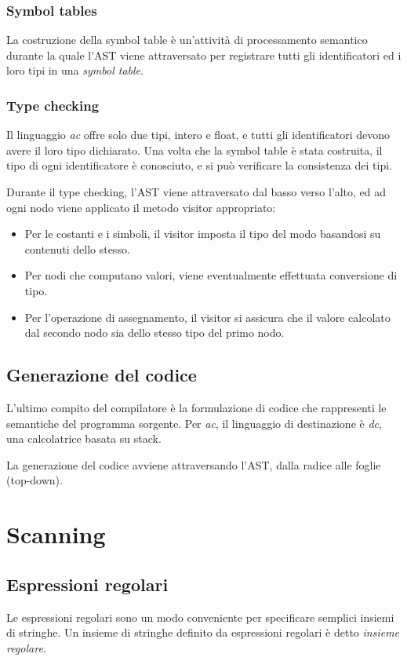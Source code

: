\documentclass[11pt]{article}
\begin{document}
\subsubsection{Symbol tables}
La costruzione della symbol table è un'attività di processamento semantico durante la quale l'AST viene attraversato per 
registrare tutti gli identificatori ed i loro tipi in una \textit{symbol table}.
\subsubsection{Type checking}
Il linguaggio \textit{ac} offre solo due tipi, intero e float, e tutti gli identificatori devono avere il loro tipo 
dichiarato. Una volta che la symbol table è stata costruita, il tipo di ogni identificatore è conosciuto, e si può verificare 
la consistenza dei tipi.

Durante il type checking, l'AST viene attraversato dal basso verso l'alto, ed ad ogni nodo viene applicato il metodo 
visitor appropriato:
\begin{itemize}
    \item Per le costanti e i simboli, il visitor imposta il tipo del modo basandosi su contenuti dello stesso.
    \item Per nodi che computano valori, viene eventualmente effettuata conversione di tipo.
    \item Per l'operazione di assegnamento, il visitor si assicura che il valore calcolato dal secondo nodo sia dello 
    stesso tipo del primo nodo.
\end{itemize}
\subsection{Generazione del codice}
L'ultimo compito del compilatore è la formulazione di codice che rappresenti le semantiche del programma sorgente. 
Per \textit{ac}, il linguaggio di destinazione è \textit{dc}, una calcolatrice basata su stack. 

La generazione del codice avviene attraversando l'AST, dalla radice alle foglie (top-down).
\section{Scanning}
\subsection{Espressioni regolari}
Le espressioni regolari sono un modo conveniente per specificare semplici insiemi di stringhe. Un insieme di stringhe 
definito da espressioni regolari è detto \textit{insieme regolare}.
\end{document}
